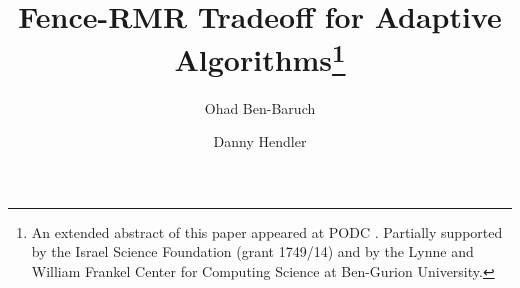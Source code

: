 
\title{Fence-RMR Tradeoff for Adaptive Algorithms\thanks{
				An extended abstract of this paper appeared at PODC \cite{DBLP:conf/podc/Ben-BaruchH15}.
                Partially supported by the Israel Science Foundation
                (grant 1749/14) and by the Lynne and William Frankel Center for Computing Science at Ben-Gurion University.}}

\author{Ohad Ben-Baruch         \and
	Danny Hendler
}


		
\maketitle

